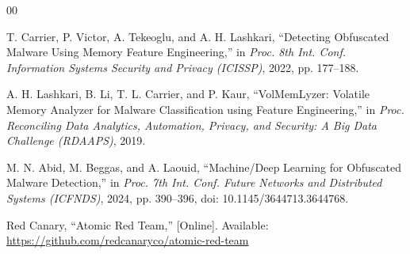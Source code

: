 \documentclass[conference]{IEEEtran}
\begin{document}
\begin{thebibliography}{00}

 T. Carrier, P. Victor, A. Tekeoglu, and A. H. Lashkari,
``Detecting Obfuscated Malware Using Memory Feature Engineering,'' in
\textit{Proc. 8th Int. Conf. Information Systems Security and Privacy
(ICISSP)}, 2022, pp. 177--188.

 A. H. Lashkari, B. Li, T. L. Carrier, and P. Kaur,
``VolMemLyzer: Volatile Memory Analyzer for Malware Classification using Feature
Engineering,'' in \textit{Proc. Reconciling Data Analytics, Automation,
Privacy, and Security: A Big Data Challenge (RDAAPS)}, 2019.

 M. N. Abid, M. Beggas, and A. Laouid, ``Machine/Deep
Learning for Obfuscated Malware Detection,'' in \textit{Proc. 7th Int. Conf.
Future Networks and Distributed Systems (ICFNDS)}, 2024, pp. 390--396,
doi: 10.1145/3644713.3644768.

 Red Canary, ``Atomic Red Team,'' [Online]. Available:
\url{https://github.com/redcanaryco/atomic-red-team}


\end{thebibliography}
\end{document}
